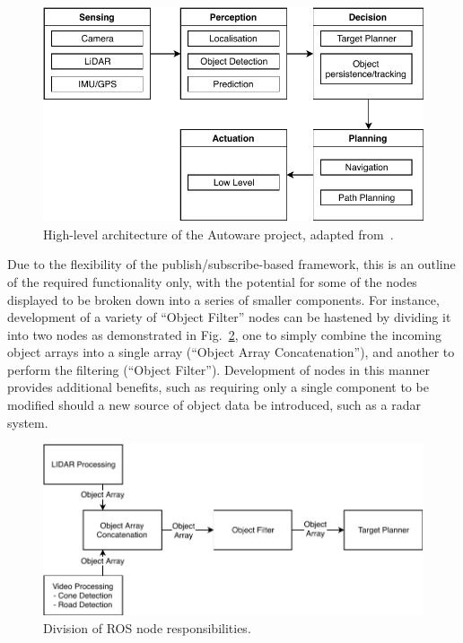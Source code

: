 
\begin{figure}[H] %
	\centering
	\includegraphics[width=0.9\columnwidth]{autowareArchitecture}
	\caption[High-level architecture of the Autoware project]{High-level architecture of the Autoware project, adapted from~\cite{autoware_open-source_2019}.}
	\label{fig:8:autowareArchitecture}
\end{figure}

Due to the flexibility of the publish/subscribe-based framework, this is an outline of the required functionality only, with the potential for some of the nodes displayed to be broken down into a series of smaller components.
For instance, development of a variety of ``Object Filter'' nodes can be hastened by dividing it into two nodes as demonstrated in Fig.~\ref{fig:8:objectFilterDivision}, one to simply combine the incoming object arrays into a single array (``Object Array Concatenation''), and another to perform the filtering (``Object Filter'').
Development of nodes in this manner provides additional benefits, such as requiring only a single component to be modified should a new source of object data be introduced, such as a radar system.

\begin{figure}[H]
	\centering
	\includegraphics[width=0.9\columnwidth]{objectFilterDivision}
	\caption{Division of ROS node responsibilities.}
	\label{fig:8:objectFilterDivision}
\end{figure}

